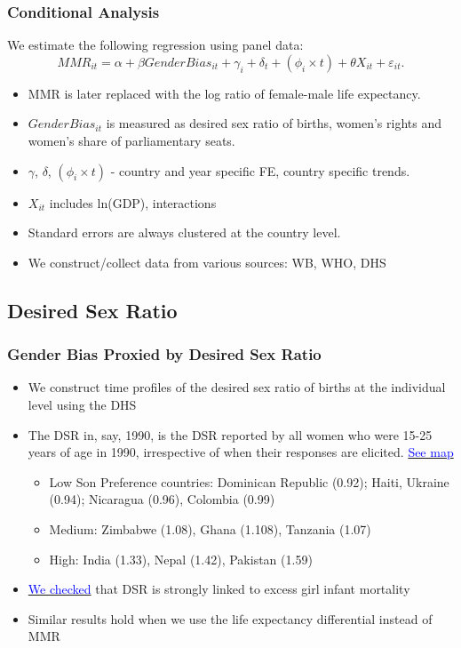 \documentclass[10pt,letterpaper,subeqn]{beamer}
\begin{document}
\begin{frame}[label=CC]
\frametitle{Conditional Analysis}
We estimate the following regression using panel data:
	\begin{equation}
		MMR_{it} = \alpha + \beta GenderBias_{it} + \gamma_i + \delta_t + 
               (\phi_i\times t) + \theta X_{it} + \varepsilon_{it}. \nonumber
	\end{equation}
\begin{itemize}
\setlength{\itemsep}{10pt}
	\item MMR is later replaced with the log ratio of female-male life expectancy.
  \item $GenderBias_{it}$ is measured as desired sex ratio of births, women's 
        rights and women's share of parliamentary seats.
	\item $\gamma$, $\delta$, $(\phi_i\times t)$ - country and year specific FE,
        country specific trends.  
  \item $X_{it}$ includes ln(GDP), interactions
	\item Standard errors are always clustered at the country level.
  \item We construct/collect data from various
        sources: WB, WHO, DHS
\end{itemize}
\end{frame}

\subsection{Desired Sex Ratio}

\begin{frame}
\frametitle{Gender Bias Proxied by Desired Sex Ratio}
\begin{itemize}
\setlength{\itemsep}{15pt}
\item We construct time profiles of the desired sex ratio of births at the individual level using the DHS
\item The DSR in, say, 1990, is the DSR reported by all women who were 15-25 years of age in 1990, irrespective of when their responses are elicited.
{\footnotesize \hyperlink{DSRMap}{\textcolor{blue}{See map}}}
\begin{itemize}
\item Low Son Preference countries: Dominican Republic (0.92); Haiti, Ukraine (0.94); Nicaragua (0.96), Colombia (0.99) 
\item Medium: Zimbabwe (1.08), Ghana (1.108), Tanzania (1.07) 
\item High: India (1.33), Nepal (1.42), Pakistan (1.59)
\end{itemize}
\item \hyperlink{DSRIMR}{\textcolor{blue}{We checked}} that DSR is strongly linked to excess girl infant mortality
\item Similar results hold when we use the life expectancy differential instead of MMR
\end{itemize}
\end{frame}
\end{document}
